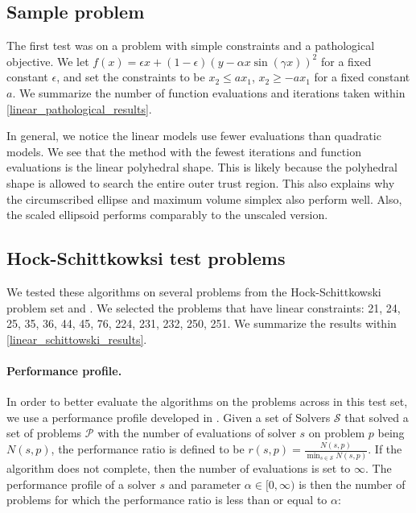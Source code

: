 \documentclass{article}
\begin{document}
\subsection{Sample problem}

The first test was on a problem with simple constraints and a pathological objective.
We let $f(x) = \epsilon x + (1-\epsilon)(y - \alpha x \sin(\gamma x))^2$ for a fixed constant $\epsilon$, and set the constraints to be
$x_2 \le ax_1$, $x_2 \ge -ax_1$ for a fixed constant $a$.
We summarize the number of function evaluations and iterations taken within \cref{linear_pathological_results}.

In general, we notice the linear models use fewer evaluations than quadratic models.
We see that the method with the fewest iterations and function evaluations is the linear polyhedral shape.
This is likely because the polyhedral shape is allowed to search the entire outer trust region.
This also explains why the circumscribed ellipse and maximum volume simplex also perform well.
Also, the scaled ellipsoid performs comparably to the unscaled version.

\pagebreak

\subsection{Hock-Schittkowksi test problems}


We tested these algorithms on several problems from the Hock-Schittkowski problem set \cite{Schittkowski1981MoreTE} and \cite{Hock1980}.
We selected the problems that have linear constraints: 21, 24, 25, 35, 36, 44, 45, 76, 224, 231, 232, 250, 251.
We summarize the results within \cref{linear_schittowski_results}.


\paragraph*{Performance profile.}
\label{performance_profile}
In order to better evaluate the algorithms on the problems across in this test set, we use a performance profile developed in \cite{More:2009:BDO:1654367.1654371}.
Given a set of Solvers $\mathcal S$ that solved a set of problems $\mathcal P$ with the number of evaluations of solver $s$ on problem $p$ being $N(s, p)$, the performance ratio is defined to be $r(s, p) = \frac{N(s, p)}{\min_{s \in \mathcal S} N(s, p)}$.
If the algorithm does not complete, then the number of evaluations is set to $\infty$.
The performance profile of a solver $s$ and parameter $\alpha \in [0, \infty)$ is then the number of problems for which the performance ratio is less than or equal to $\alpha$: 
\end{document}
